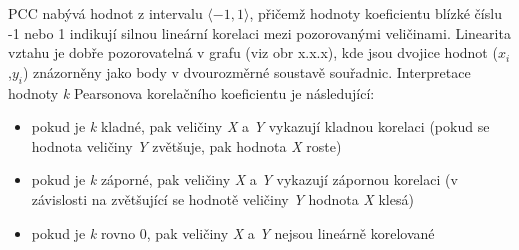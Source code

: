 PCC nabývá hodnot z intervalu $\langle-1, 1 \rangle$, přičemž hodnoty koeficientu blízké číslu -1 nebo 1 indikují silnou lineární korelaci mezi pozorovanými veličinami. Linearita vztahu je dobře pozorovatelná v grafu (viz obr x.x.x), kde jsou dvojice hodnot ($x_i$,$y_i$) znázorněny jako body v dvourozměrné soustavě souřadnic. Interpretace hodnoty \textit{k} Pearsonova korelačního koeficientu je následující: 
\begin{itemize}
    \item pokud je \textit{k} kladné, pak veličiny \textit{X} a \textit{Y} vykazují kladnou korelaci (pokud se hodnota veličiny \textit{Y} zvětšuje, pak hodnota\textit{ X} roste)
    \item pokud je \textit{k} záporné, pak veličiny \textit{X} a \textit{Y} vykazují zápornou korelaci (v závislosti na zvětšující se hodnotě veličiny \textit{Y} hodnota \textit{X} klesá)
    \item pokud je \textit{k} rovno 0, pak veličiny \textit{X} a \textit{Y} nejsou lineárně korelované
\end{itemize}


